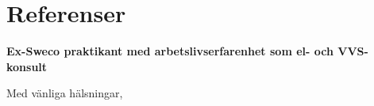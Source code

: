 \documentclass[11pt,a4paper,sans]{moderncv}        %
\begin{document}
\section{Referenser}


%


\clearpage
\date{\today}
\opening{\textbf{Ex-Sweco praktikant med arbetslivserfarenhet som el- och VVS-konsult}}
\closing{Med v{\"a}nliga h{\"a}lsningar,}
\makelettertitle






\end{document}
